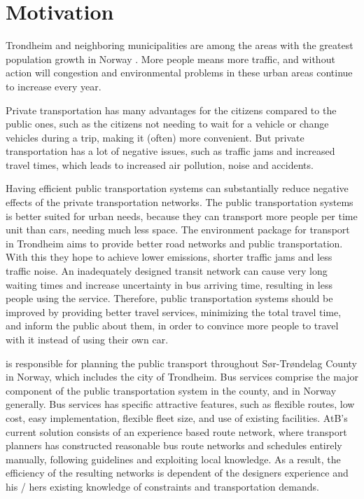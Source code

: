 \section{Motivation} 
\label{sec:motivation}

Trondheim and neighboring municipalities are among the areas with the greatest population growth in Norway \citep{website:miljopakken}. More people means more traffic, and without action will congestion and environmental problems in these urban areas continue to increase every year.\par
Private transportation has many advantages for the citizens compared to the public ones, such as the citizens not needing to wait for a vehicle or change vehicles during a trip, making it (often) more convenient. But private transportation has a lot of negative issues, such as traffic jams and increased travel times, which leads to increased air pollution, noise and accidents. 

Having efficient public transportation systems can substantially reduce negative effects of the private transportation networks. The public transportation systems is better suited for urban needs, because they can transport more people per time unit than cars, needing much less space. The environment package \citep{website:miljopakken} for transport in Trondheim aims to provide better road networks and public transportation. With this they hope to achieve lower emissions, shorter traffic jams and less traffic noise. An inadequately designed transit network can cause very long waiting times and increase uncertainty in bus arriving time, resulting in less people using the service. Therefore, public transportation systems should be improved by providing better travel services, minimizing the total travel time, and inform the public about them, in order to convince more people to travel with it instead of using their own car.

\citet{website:atb} is responsible for planning the public transport throughout Sør-Trøndelag County in Norway, which includes the city of Trondheim. Bus services comprise the major component of the public transportation system in the county, and in Norway generally. Bus services has specific attractive features, such as flexible routes, low cost, easy implementation, flexible fleet size, and use of existing facilities. 
AtB's current solution consists of an experience based route network, where transport planners has constructed reasonable bus route networks and schedules entirely manually, following guidelines and exploiting local knowledge. As a result, the efficiency of the resulting networks is dependent of the designers experience and his / hers existing knowledge of constraints and transportation demands.

